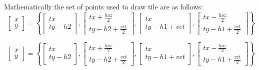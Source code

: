 Mathematically the set of points used to draw tile are as follows:
\begin{equation}
\; \left[ \begin{array}{c} x \\ y \end{array} \right]=\left\{ \left[ \begin{array}{c} tx \\ ty-h2 \end{array} \right],\left[ \begin{array}{c} tx+\frac{hoz}{2} \\ ty-h2+\frac{vet}{2} \end{array} \right],\left[ \begin{array}{c} tx \\ ty-h1+vet \end{array} \right],\left[ \begin{array}{c} tx-\frac{hoz}{2} \\ ty-h1+\frac{vet}{2} \end{array} \right] \right\}
\end{equation}

\begin{equation}
\; \left[ \begin{array}{c} x \\ y \end{array} \right]=\left\{ \left[ \begin{array}{c} tx \\ ty-h2 \end{array} \right],\left[ \begin{array}{c} tx+\frac{hoz}{2} \\ ty-h2+\frac{vet}{2} \end{array} \right],\left[ \begin{array}{c} tx \\ ty-h1+vet \end{array} \right],\left[ \begin{array}{c} tx-\frac{hoz}{2} \\ ty-h1+\frac{vet}{2} \end{array} \right]\right\}
\end{equation}

